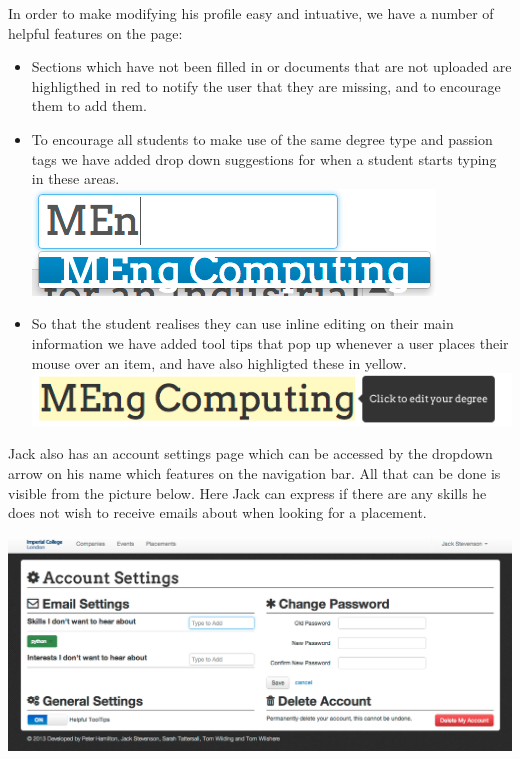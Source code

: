     In order to make modifying his profile easy and intuative, we have a number of helpful features on the page:
    \begin{itemize}
      \item Sections which have not been filled in or documents that are not uploaded are highligthed in red to notify the user that they are missing, and to encourage them to add them.
      \item To encourage all students to make use of the same degree type and passion tags we have added drop down suggestions for when a student starts typing in these areas.
      \includegraphics[scale=0.5]{images/user_experiences/student/edit_suggestions}
      \item So that the student realises they can use inline editing on their main information we have added tool tips that pop up whenever a user places their mouse over an item, and have also highligted these in yellow.
      \includegraphics[scale=0.5]{images/user_experiences/student/edit_degree_tooltip}
    \end{itemize} 

    Jack also has an account settings page which can be accessed by the dropdown arrow on his name which features on the navigation bar. All that can be done is visible from the picture below. Here Jack can express if there are any skills he does not wish to receive emails about when looking for a placement.

    \includegraphics[scale=0.3]{images/user_experiences/student/account_settings}

